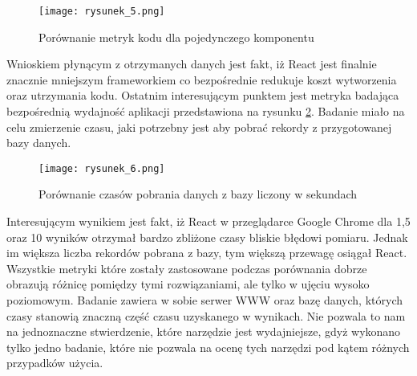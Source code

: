 \begin{figure}[!ht]
    \centering
    \texttt{[image: rysunek\_5.png]}
    \caption{Porównanie metryk kodu dla pojedynczego komponentu \cite{polibuda}}
    \label{fig:rysunek_5}
\end{figure}

Wnioskiem płynącym z otrzymanych danych jest fakt, iż React jest finalnie znacznie mniejszym frameworkiem co bezpośrednie redukuje koszt wytworzenia oraz utrzymania kodu.
Ostatnim interesującym punktem jest metryka badająca bezpośrednią wydajność aplikacji przedstawiona na rysunku \ref{fig:rysunek_6}.
Badanie miało na celu zmierzenie czasu, jaki potrzebny jest aby pobrać rekordy z przygotowanej bazy danych.

\begin{figure}[!ht]
    \centering
    \texttt{[image: rysunek\_6.png]}
    \caption{Porównanie czasów pobrania danych z bazy liczony w sekundach \cite{polibuda}}
    \label{fig:rysunek_6}
\end{figure}

Interesującym wynikiem jest fakt, iż React w przeglądarce Google Chrome dla 1,5 oraz 10 wyników otrzymał bardzo zbliżone czasy bliskie błędowi pomiaru.
Jednak im większa liczba rekordów pobrana z bazy, tym większą przewagę osiągał React. 
Wszystkie metryki które zostały zastosowane podczas porównania dobrze obrazują różnicę pomiędzy tymi rozwiązaniami, ale tylko w ujęciu wysoko poziomowym.
Badanie zawiera w sobie serwer WWW oraz bazę danych, których czasy stanowią znaczną część czasu uzyskanego w wynikach.
Nie pozwala to nam na jednoznaczne stwierdzenie, które narzędzie jest wydajniejsze, gdyż wykonano tylko jedno badanie, które nie pozwala na ocenę tych narzędzi pod kątem różnych przypadków użycia.
